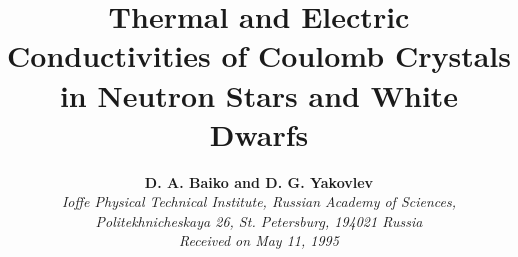 \textwidth=15cm
\textheight=20cm
\def\baselinestretch{1.2}
\hoffset=-1cm



\title{\bf Thermal and Electric Conductivities of Coulomb Crystals 
           in Neutron Stars and White Dwarfs}



\author{ {\bf D. A. Baiko and D. G. Yakovlev} \\
         {\it Ioffe Physical Technical Institute, 
              Russian Academy of Sciences,} \\
         {\it Politekhnicheskaya 26, St. Petersburg, 194021 Russia} \\
         {\it Received on May 11, 1995}}


\date{${}$}
\maketitle


\def\la{\;\raise0.3ex\hbox{$<$\kern-0.75em\raise-1.1ex\hbox{$\sim$}}\;}
\def\ga{\;\raise0.3ex\hbox{$>$\kern-0.75em\raise-1.1ex\hbox{$\sim$}}\;}
\newcommand{\om}{\mbox{$\omega$}}              %
\newcommand{\th}{\mbox{$\vartheta$}}           %
\newcommand{\ph}{\mbox{$\varphi$}}             %
\newcommand{\ep}{\mbox{$\varepsilon$}}         %
\newcommand{\ka}{\mbox{$\kappa$}}              %
\newcommand{\dd}{\mbox{d}}                     %
\newcommand{\vp}{\mbox{\boldmath $p$}}         %
\newcommand{\vk}{\mbox{\boldmath $k$}}         %
\newcommand{\vq}{\mbox{\boldmath $q$}}         %
\newcommand{\vv}{\mbox{\boldmath $v$}}         %
\newcommand{\vect}[1]{\mbox{\boldmath $#1$}}   %
\newcommand{\vF}{\mbox{$v_{\rm F}$}}           %
\newcommand{\pF}{\mbox{$p_{\rm F}$}}           %
\newcommand{\kF}{\mbox{$k_{\rm F}$}}           %
\newcommand{\kTF}{\mbox{$k_{\rm TF}$}}         %
\newcommand{\kB}{\mbox{$k_{\rm B}$}}           %

